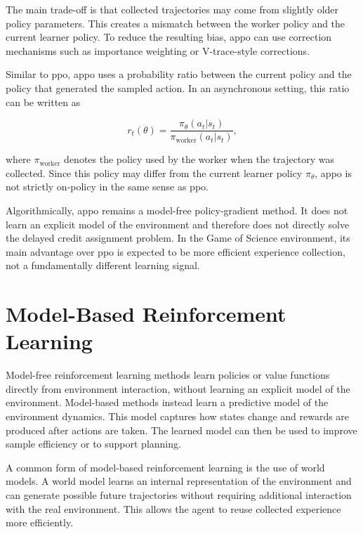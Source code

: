 \documentclass[english,bachelor]{hsluthesis}
\begin{document}
The main trade-off is that collected trajectories may come from slightly older policy parameters. This creates a mismatch between the worker policy and the current learner policy. To reduce the resulting bias, \gls{appo} can use correction mechanisms such as importance weighting or V-trace-style corrections.

Similar to \gls{ppo}, \gls{appo} uses a probability ratio between the current policy and the policy that generated the sampled action. In an asynchronous setting, this ratio can be written as

\begin{equation}
r_t(\theta) =
\frac{\pi_\theta(a_t|s_t)}
{\pi_{\text{worker}}(a_t|s_t)},
\end{equation}

where $\pi_{\text{worker}}$ denotes the policy used by the worker when the trajectory was collected. Since this policy may differ from the current learner policy $\pi_\theta$, \gls{appo} is not strictly on-policy in the same sense as \gls{ppo}.

Algorithmically, \gls{appo} remains a model-free policy-gradient method. It does not learn an explicit model of the environment and therefore does not directly solve the delayed credit assignment problem. In the Game of Science environment, its main advantage over \gls{ppo} is expected to be more efficient experience collection, not a fundamentally different learning signal.

\section{Model-Based Reinforcement Learning}

Model-free reinforcement learning methods learn policies or value functions directly from environment interaction, without learning an explicit model of the environment. Model-based methods instead learn a predictive model of the environment dynamics. This model captures how states change and rewards are produced after actions are taken. The learned model can then be used to improve sample efficiency or to support planning.

A common form of model-based reinforcement learning is the use of world models. A world model learns an internal representation of the environment and can generate possible future trajectories without requiring additional interaction with the real environment. This allows the agent to reuse collected experience more efficiently.
\end{document}
